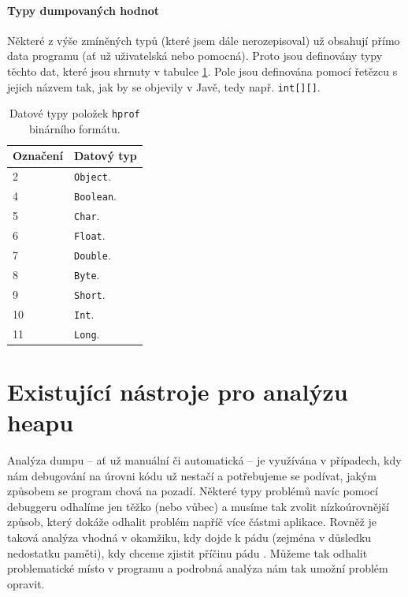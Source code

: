 \subsubsection{Typy dumpovaných hodnot}
Některé z výše zmíněných typů (které jsem dále nerozepisoval) už obsahují přímo data programu (ať už uživatelská nebo pomocná). Proto jsou definovány typy těchto dat, které jsou shrnuty v tabulce \ref{table-hprof-data-types}. Pole jsou definována pomocí řetězcu s jejich názvem tak, jak by se objevily v Javě, tedy např. \texttt{int[][]}.
\begin{table}[ht!]
    \begin{tabularx}{\textwidth}{|l|X|}
        \hline
    \textbf{Označení} & \textbf{Datový typ} \\ \hline \hline
    2 & \texttt{Object}. \\
    4 & \texttt{Boolean}. \\
    5 & \texttt{Char}. \\
    6 & \texttt{Float}. \\
    7 & \texttt{Double}. \\
    8 & \texttt{Byte}. \\
    9 & \texttt{Short}. \\
    10 & \texttt{Int}. \\
    11 & \texttt{Long}. \\ \hline
    \end{tabularx}
    \caption{Datové typy položek \texttt{hprof} binárního formátu.}
    \label{table-hprof-data-types}
\end{table}




\chapter{Existující nástroje pro analýzu heapu}

Analýza dumpu -- ať už manuální či automatická -- je využívána v případech, kdy nám debugování na úrovni kódu už nestačí a potřebujeme se podívat, jakým způsobem se program chová na pozadí. Některé typy problémů navíc pomocí debuggeru odhalíme jen těžko (nebo vůbec) a musíme tak zvolit nízkoúrovnější způsob, který dokáže odhalit problém napříč více částmi aplikace. Rovněž je taková analýza vhodná v okamžiku, kdy dojde k pádu (zejména v důsledku nedostatku paměti), kdy chceme zjistit příčinu pádu . Můžeme tak odhalit problematické místo v programu a podrobná analýza nám tak umožní problém opravit.

